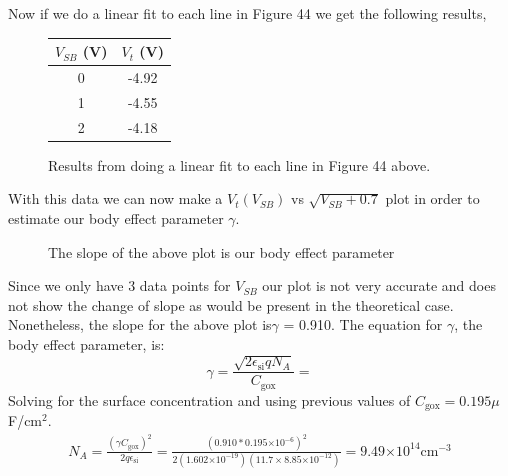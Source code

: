 \documentclass{article}
\providecommand{\e}[1]{\ensuremath{\times 10^{#1}}}
\begin{document}
Now if we do a linear fit to each line in Figure 44 we get the following results,

\begin{figure}[H]
\centering
\begin{tabular}{c || c}
$V_{SB}$ (V) & $V_t$ (V) \\ \hline
0 & -4.92 \\ \hline
1 & -4.55 \\ \hline
2 & -4.18 \\ \hline
\end{tabular}
\caption{Results from doing a linear fit to each line in Figure 44 above.}
\end{figure}

With this data we can now make a $V_t(V_{SB})$ vs $\sqrt{V_{SB} + 0.7}$ plot in order to estimate our body effect parameter $\gamma$.
\begin{figure}[H]
\centering
{}
\caption{The slope of the above plot is our body effect parameter}
\end{figure}
Since we only have 3 data points for $V_{SB}$ our plot is not very accurate and does not show the change of slope as would be present in the theoretical case. Nonetheless, the slope for the above plot is$\gamma$ = 0.910. The equation for $\gamma$, the body effect parameter, is:
\begin{equation}
\gamma = \frac{\sqrt{2\epsilon_{\text{si}} q N_A}}{C_{\text{gox}}} = 
\end{equation}
Solving for the surface concentration and using previous values of $C_{\text{gox}} = 0.195 \mu$F/${\text{cm}}^2$.
\begin{align*}
N_A = \frac{(\gamma C_{\text{gox}})^2}{2q\epsilon_{\text{si}}} = \frac{(0.910*0.195\e{-6})^2}{2(1.602\e{-19})(11.7\times 8.85\e{-12})} = 9.49\e{14} {\text{cm}}^{-3}
\end{align*}
\end{document}
